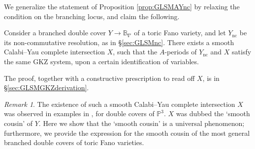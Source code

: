 \documentclass[12pt,a4paper,oneside]{amsart}
\numberwithin{equation}{section}
\theoremstyle{definition}
\theoremstyle{remark}
\newtheorem{rmk}[thm]{Remark}
\newcommand{\cP}{\mathbb{P}}
\newcommand{\cB}{\mathbb{B}}
\newcommand{\Ync}{Y_{\mathrm{nc}}}
\begin{document}
We generalize the statement of Proposition \ref{prop:GLSMAYnc} by relaxing the condition on the branching locus, and claim the following.\par
	Consider a branched double cover $Y \longrightarrow \cB_{\nabla}$ of a toric Fano variety, and let $\Ync$ be its non-commutative resolution, as in \S\ref{sec:GLSMnc}.
	There exists a smooth Calabi--Yau complete intersection $X$, such that the $A$-periods of $\Ync$ and $X$ satisfy the same GKZ system, upon a certain identification of variables.\par
The proof, together with a constructive prescription to read off $X$, is in \S\ref{sec:GLSMGKZderivation}. 

\begin{rmk}The existence of such a smooth Calabi--Yau complete intersection $X$ was observed in examples in \cite{Katz:2023zan}, for double covers of $\cP^3$. $X$ was dubbed the `smooth cousin' of $Y$. Here we show that the `smooth cousin' is a universal phenomenon; furthermore, we provide the expression for the smooth cousin of the most general branched double covers of toric Fano varieties.
\end{rmk}
\end{document}
